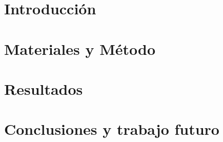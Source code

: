 \documentclass[runningheads,a4paper]{llncs}
\begin{document}
\section{Introducción}




\section{Materiales y Método}


\section{Resultados}


\section{Conclusiones y trabajo futuro}




\end{document}
